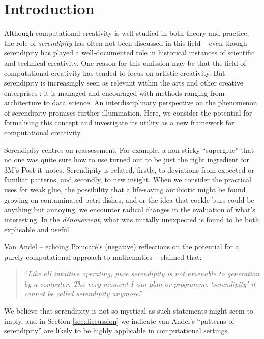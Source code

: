\section{Introduction}

Although computational creativity is well studied in both theory and
practice, the role of \emph{serendipity} has often not been discussed
in this field -- even though serendipity has played a well-documented
role in historical instances of scientific and technical creativity.
One reason for this omission may be that the field of computational
creativity has tended to focus on artistic creativity.  But
serendipity is increasingly seen as relevant within the arts
\cite{mckay-serendipity} and other creative enterprises
\cite{kakko2009homo,engineering-serendipity}: it is managed and
encouraged with methods ranging from architecture to data science.
%
An interdisciplinary perspective on the phenomenon of serendipity
promises further illumination.  Here, we consider the potential for
formalising this concept and investigate its utility as a new
framework for computational creativity.

Serendipity centres on reassessment.  For example, a non-sticky
``superglue'' that no one was quite sure how to use turned out to be
just the right ingredient for 3M's Post-it\texttrademark\ notes.
%
Serendipity is related, firstly, to deviations from expected or
familiar patterns, and secondly, to new insight.
%
When we consider the practical uses for weak glue, the possibility
that a life-saving antibiotic might be found growing on contaminated
petri dishes, and or the idea that cockle-burs could be anything but
annoying, we encounter radical changes in the evaluation of what's
interesting.  In the \emph{d\'enouement}, what was initially
unexpected is found to be both explicable and useful.

Van Andel \citeyear{van1994anatomy} -- echoing Poincar\'e's
\citeyear{poincare1910creation} (negative) reflections on the potential
for a purely computational approach to mathematics -- claimed that:
\begin{quote}
``\emph{Like all intuitive operating, pure serendipity is not amenable
    to generation by a computer.  The very moment I can plan or
    programme `serendipity' it cannot be called serendipity
    anymore}.'' \cite{van1994anatomy}
\end{quote}
We believe that serendipity is not so mystical as such statements
might seem to imply, and in Section \ref{sec:discussion} we indicate
van Andel's ``patterns of serendipity'' are likely to be highly
applicable in computational settings.

